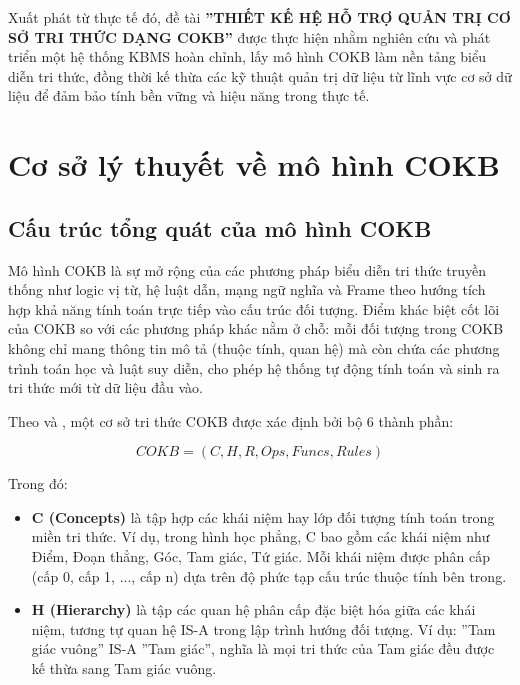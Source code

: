 \documentclass[13pt,a4paper,oneside]{extreport}
\begin{document}
Xuất phát từ thực tế đó, đề tài \textbf{''THIẾT KẾ HỆ HỖ TRỢ QUẢN TRỊ CƠ SỞ TRI THỨC DẠNG COKB''} được thực hiện nhằm nghiên cứu và phát triển một hệ thống KBMS hoàn chỉnh, lấy mô hình COKB làm nền tảng biểu diễn tri thức, đồng thời kế thừa các kỹ thuật quản trị dữ liệu từ lĩnh vực cơ sở dữ liệu để đảm bảo tính bền vững và hiệu năng trong thực tế.


\section{Cơ sở lý thuyết về mô hình COKB}


\subsection{Cấu trúc tổng quát của mô hình COKB}


Mô hình COKB là sự mở rộng của các phương pháp biểu diễn tri thức truyền thống  như logic vị từ, hệ luật dẫn, mạng ngữ nghĩa và Frame  theo hướng tích hợp khả năng tính toán trực tiếp vào cấu trúc đối tượng. Điểm khác biệt cốt lõi của COKB so với các phương pháp khác nằm ở chỗ: mỗi đối tượng trong COKB không chỉ mang thông tin mô tả (thuộc tính, quan hệ) mà còn chứa các phương trình toán học và luật suy diễn, cho phép hệ thống tự động tính toán và sinh ra tri thức mới từ dữ liệu đầu vào.


Theo \cite{DoVanNhon1} và \cite{Dvn_Somet}, một cơ sở tri thức COKB được xác định bởi bộ 6 thành phần:


\begin{equation}
COKB = (C, H, R, Ops, Funcs, Rules)
\end{equation}


Trong đó:


\begin{itemize}
  \item \textbf{C (Concepts)} là tập hợp các khái niệm hay lớp đối tượng tính toán trong miền tri thức. Ví dụ, trong hình học phẳng, C bao gồm các khái niệm như Điểm, Đoạn thẳng, Góc, Tam giác, Tứ giác. Mỗi khái niệm được phân cấp (cấp 0, cấp 1, ..., cấp n) dựa trên độ phức tạp cấu trúc thuộc tính bên trong.
\end{itemize}



\begin{itemize}
  \item \textbf{H (Hierarchy)} là tập các quan hệ phân cấp đặc biệt hóa giữa các khái niệm, tương tự quan hệ IS-A trong lập trình hướng đối tượng. Ví dụ: ''Tam giác vuông'' IS-A ''Tam giác'', nghĩa là mọi tri thức của Tam giác đều được kế thừa sang Tam giác vuông.
\end{itemize}
\end{document}
